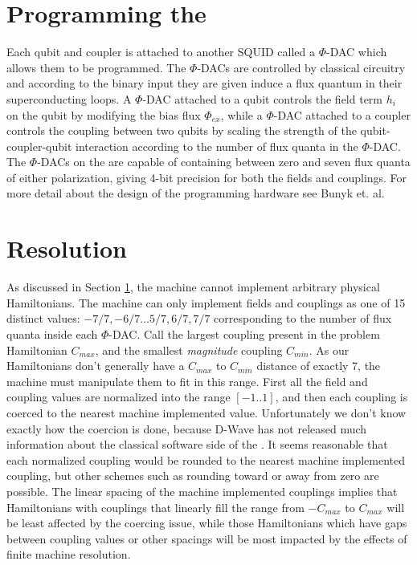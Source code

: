 \section{Programming the \machine}
\label{sec:machine_prog}
Each qubit and coupler is attached to another SQUID called a $\Phi$-DAC which allows them to be programmed.  The $\Phi$-DACs are controlled by classical circuitry and according to the binary input they are given induce a flux quantum in their superconducting loops.  A $\Phi$-DAC attached to a qubit controls the field term $h_i$ on the qubit by modifying the bias flux $\Phi_{ex}$, while a $\Phi$-DAC attached to a coupler controls the coupling between two qubits by scaling the strength of the qubit-coupler-qubit interaction according to the number of flux quanta in the $\Phi$-DAC.  The $\Phi$-DACs on the \machine are capable of containing between zero and seven flux quanta of either polarization, giving 4-bit precision for both the fields and couplings.  For more detail about the design of the programming hardware see Bunyk et. al.\cite{bunyk}

\section{Resolution}
\label{sec:resolution}
As discussed in Section \ref{sec:machine_prog}, the \machine machine cannot implement arbitrary physical Hamiltonians.  The machine can only implement fields and couplings as one of 15 distinct values: $-7/7, -6/7 \dots 5/7,6/7, 7/7$ corresponding to the number of flux quanta inside each $\Phi$-DAC.  Call the largest coupling present in the problem Hamiltonian $C_{max}$, and the smallest \emph{magnitude} coupling $C_{min}$.  As our Hamiltonians don't generally have a $C_{max}$ to $C_{min}$ distance of exactly 7, the machine must manipulate them to fit in this range.
First  all the field and coupling values are normalized into the range $[-1..1]$, and then each coupling is coerced to the nearest machine implemented value.
Unfortunately we don't know exactly how the coercion is done, because D-Wave has not released much information about the classical software side of the \machine.  It seems reasonable that each normalized coupling would be rounded to the nearest machine implemented coupling, but other schemes such as rounding toward or away from zero are possible.
The linear spacing of the machine implemented couplings implies that Hamiltonians with couplings that linearly fill the range from $-C_{max}$ to $C_{max}$ will be least affected by the coercing issue, while those Hamiltonians which have gaps between coupling values or other spacings will be most impacted by the effects of finite machine resolution.

